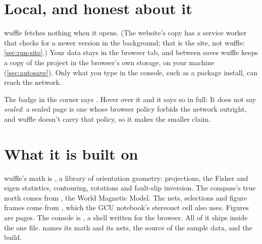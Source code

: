 \section{Local, and honest about it}\label{sec:local}

wuffle fetches nothing when it opens. (The website's copy has a service worker that checks for a newer
version in the background; that is the site, not wuffle: \cref{sec:run-site}.) Your data stays in the
browser tab, and between saves wuffle keeps a copy of the project in the browser's own storage, on your
machine (\cref{sec:autosave}). Only what you type in the console, such as a package install, can reach
the network.

The badge in the corner says . Hover over it and it says so in full:  It does not say \emph{sealed}: a
sealed page is one whose browser policy forbids the network outright, and wuffle doesn't carry that
policy, so it makes the smaller claim.

\section{What it is built on}

wuffle's math is , a library of orientation geometry: projections, the Fisher and
eigen statistics, contouring, rotations and fault-slip inversion. The compass's true north comes from
, the World Magnetic Model. The nets, selections and figure frames come from
, which the GCU notebook's stereonet cell also uses. Figures are 
pages. The console is , a shell written for the browser. All of it ships inside the one file.
 names its math and its nets, the source of the sample
data, and the build.
